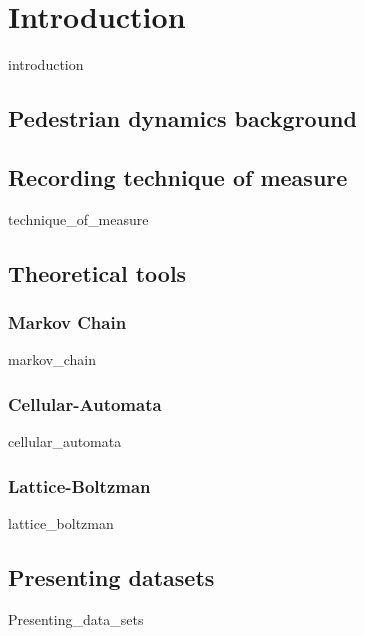 \documentclass[10pt,a4paper]{report}
\begin{document}

\begin{abstract}
	{abstract}
\end{abstract}



\tableofcontents



\chapter{Introduction}

	{introduction}

\section{Pedestrian dynamics background}
	

\section{Recording technique of measure}
	{technique_of_measure}

\section{Theoretical tools}

\subsection{Markov Chain}
	{markov_chain}

\subsection{Cellular-Automata}
	{cellular_automata}

\subsection{Lattice-Boltzman}
	{lattice_boltzman}

\section{Presenting datasets}
	{Presenting_data_sets}
\end{document}
